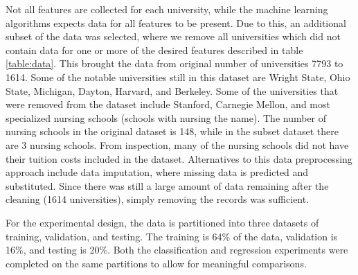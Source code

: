 \documentclass[10pt]{article}
\begin{document}
Not all features are collected for each university, while the machine learning algorithms expects data for all features to be present. Due to this, an additional subset of the data was selected, where we remove all universities which did not contain data for one or more of the desired features described in table \ref{table:data}. This brought the data from original number of universities 7793 to 1614. Some of the notable universities still in this dataset are Wright State, Ohio State, Michigan, Dayton, Harvard, and Berkeley. Some of the universities that were removed from the dataset include Stanford, Carnegie Mellon, and most specialized nursing schools (schools with nursing the name). The number of nursing schools in the original dataset is 148, while in the subset dataset there are 3 nursing schools. From inspection, many of the nursing schools did not have their tuition costs included in the dataset. Alternatives to this data preprocessing approach include data imputation, where missing data is predicted and substituted. Since there was still a large amount of data remaining after the cleaning (1614 universities), simply removing the records was sufficient.

For the experimental design, the data is partitioned into three datasets of training, validation, and testing. The training is 64\% of the data, validation is 16\%, and testing is 20\%. Both the classification and regression experiments were completed on the same partitions to allow for meaningful comparisons.
\end{document}
